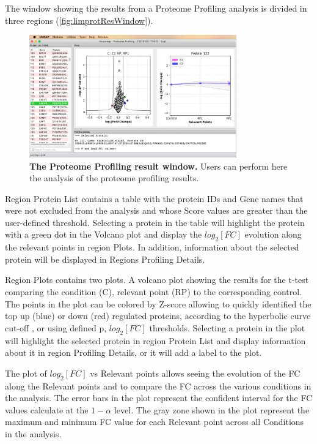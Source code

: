The window showing the results from a Proteome Profiling analysis is divided in three
regions (\autoref{fig:limprotResWindow}).

\begin{figure}[h]
    \centering
    \includegraphics[width=0.8\textwidth]{./IMAGES/MOD-PROTPROF/protprof-frag.jpg}
    \caption[The Proteome Profiling result window]{\textbf{The Proteome Profiling
    result window.} Users can perform here the analysis of the proteome profiling
    results.}
    \label{fig:protprofResultsWindow}
    \vspace{-5pt}
\end{figure}

Region Protein List contains a table with the protein IDs and Gene names that were not
excluded from the analysis and whose Score values are greater than the user-defined
threshold. Selecting a protein in the table will highlight the protein with a green
dot in the Volcano plot and display the $log_2[FC]$ evolution along the relevant points
in region Plots. In addition, information about the selected protein will be displayed
in Regions Profiling Details.

Region Plots contains two plots. A volcano plot showing the results for the t-test
comparing the condition (C), relevant point (RP) to the corresponding control. The
points in the plot can be colored by Z-score allowing to quickly identified the top
up (blue) or down (red) regulated proteins, according to the hyperbolic curve cut-off
\cite{LI2012}, or using defined p, $log_2[FC]$ thresholds. Selecting a protein in
the plot will highlight the selected protein in region Protein List and display
information about it in region Profiling Details, or it will add a label to the plot.

The plot of $log_2[FC]$ vs Relevant points allows seeing the evolution of the FC
along the Relevant points and to compare the FC across the various conditions in
the analysis. The error bars in the plot represent the confident interval for the
FC values calculate at the $1-\alpha$ level. The gray zone shown in the plot represent
the maximum and minimum FC value for each Relevant point across all Conditions in
the analysis.

